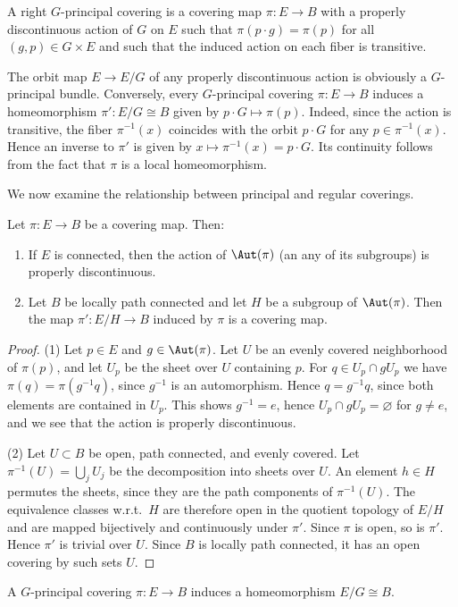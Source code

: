 \begin{defn}
    A right $G$-principal covering is a covering map $\pi:E\to B$ with a properly discontinuous action of $G$ on $E$ such that $\pi(p\cdot g)=\pi(p)$ for all $(g,p)\in G\times E$ and such that the induced action on each fiber is transitive.
\end{defn}

\begin{example}
    The orbit map $E\to E\slash G$ of any properly discontinuous action is obviously a $G$-principal bundle. Conversely, every $G$-principal covering $\pi:E\to B$ induces a homeomorphism $\pi':E\slash G\cong B$ given by $p\cdot G\mapsto \pi(p)$. Indeed, since the action is transitive, the fiber $\pi^{-1}(x)$ coincides with the orbit $p\cdot G$ for any $p\in\pi^{-1}(x)$. Hence an inverse to $\pi'$ is given by $x\mapsto \pi^{-1}(x)=p\cdot G$. Its continuity follows from the fact that $\pi$ is a local homeomorphism.
\end{example}

We now examine the relationship between principal and regular coverings. 

\begin{prop}
    Let $\pi:E\to B$ be a covering map. Then:
    \begin{enumerate}[label=(\arabic*)]
        \item If $E$ is connected, then the action of $\Aut(\pi)$ (an any of its subgroups) is properly discontinuous.
        \item Let $B$ be locally path connected and let $H$ be a subgroup of $\Aut(\pi)$. Then the map $\pi':E\slash H\to B$ induced by $\pi$ is a covering map.
    \end{enumerate}
\end{prop}
\begin{proof}
    (1) Let $p\in E$ and $g\in \Aut(\pi)$. Let $U$ be an evenly covered neighborhood of $\pi(p)$, and let $U_p$ be the sheet over $U$ containing $p$. For $q\in U_p\cap gU_p$ we have $\pi(q)=\pi(g^{-1}q)$, since $g^{-1}$ is an automorphism. Hence $q=g^{-1}q$, since both elements are contained in $U_p$. This shows $g^{-1}=e$, hence $U_p\cap gU_p=\varnothing$ for $g\neq e$, and we see that the action is properly discontinuous.

    (2) Let $U\subset B$ be open, path connected, and evenly covered. Let $\pi^{-1}(U)=\bigcup_j U_j$ be the decomposition into sheets over $U$. An element $h\in H$ permutes the sheets, since they are the path components of $\pi^{-1}(U)$. The equivalence classes w.r.t.\ $H$ are therefore open in the quotient topology of $E\slash H$ and are mapped bijectively and continuously under $\pi'$. Since $\pi$ is open, so is $\pi'$. Hence $\pi'$ is trivial over $U$. Since $B$ is locally path connected, it has an open covering by such sets $U$.
\end{proof}
\begin{cor}
    A $G$-principal covering $\pi:E\to B$ induces a homeomorphism $E\slash G\cong B$.
\end{cor}

